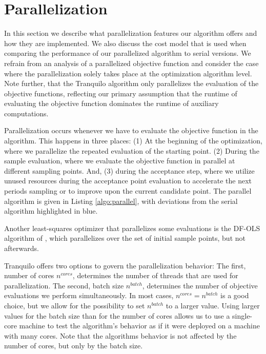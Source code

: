 \section{Parallelization}\label{sec:parallelization}

In this section we describe what parallelization features our algorithm offers and how they are
implemented. We also discuss the cost model that is used when comparing the performance of our
parallelized algorithm to serial versions. We refrain from an analysis of a parallelized objective
function and consider the case where the parallelization solely takes place at the optimization
algorithm level. Note further, that the Tranquilo algorithm only parallelizes the evaluation of
the objective functions, reflecting our primary assumption that the runtime of evaluating the
objective function dominates the runtime of auxiliary computations.

Parallelization occurs whenever we have to evaluate the objective function in the algorithm. This
happens in three places: (1) At the beginning of the optimization, where we parallelize the repeated
evaluation of the starting point. (2) During the sample evaluation, where we evaluate the objective
function in parallel at different sampling points. And, (3) during the acceptance step, where we
utilize unused resources during the acceptance point evaluation to accelerate the next periods
sampling or to improve upon the current candidate point. The parallel algorithm is given in Listing
\ref{algo:parallel}, with deviations from the serial algorithm highlighted in
blue.

Another least-squares optimizer that parallelizes some evaluations is the DF-OLS algorithm of
\cite{dfols2019}, which parallelizes over the set of initial sample points, but not afterwards.

Tranquilo offers two options to govern the parallelization behavior: The first, number of cores
$n^{cores}$, determines the number of threads that are used for parallelization. The second, batch
size $n^{batch}$, determines the number of objective evaluations we perform simultaneously. In most
cases, $n^{cores} = n^{batch}$ is a good choice, but we allow for the possibility to set $n^{batch}$
to a larger value. Using larger values for the batch size than for the number of cores allows us to
use a single-core machine to test the algorithm's behavior as if it were deployed on a machine with
many cores. Note that the algorithms behavior is not affected by the number of cores, but only by
the batch size.

